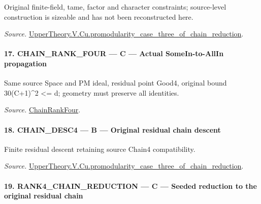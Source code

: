 \documentclass[11pt,a4paper]{article}
\numberwithin{equation}{section}
\theoremstyle{remark}\newtheorem{remark}[theorem]{Remark}
\begin{document}
Original finite-field, tame, factor and character constraints; source-level construction is sizeable and has not been reconstructed here.

\emph{Source.} \href{https://github.com/CocoSgt/riemann-hypothesis-lean/blob/7cbf7a0c32fca1badf05931879a37c3f8a2b03b4/src/Development/AutomorphicArithmetic/AutomorphicVarieties/ModularityArgument/ThresholdArguments/DenseThresholdCases/PromodularityCaseThreeOfLemmas.lean#L131-L153}{UpperTheory.V.Cu.promodularity\_\allowbreak case\_\allowbreak three\_\allowbreak of\_\allowbreak chain\_\allowbreak reduction}.



\paragraph{17. CHAIN\_\allowbreak RANK\_\allowbreak FOUR — C — Actual SomeIn-to-AllIn propagation}

Same source Space and PM ideal, residual point Good4, original bound 30(C+1)\textasciicircum{}2 <= d; geometry must preserve all identities.

\emph{Source.} \href{https://github.com/CocoSgt/riemann-hypothesis-lean/blob/7cbf7a0c32fca1badf05931879a37c3f8a2b03b4/src/Development/AutomorphicArithmetic/AutomorphicVarieties/ModularityArgument/ThresholdArguments/DenseThresholdCases/PromodularityCaseThree.lean#L26-L32}{ChainRankFour}.



\paragraph{18. CHAIN\_\allowbreak DESC4 — B — Original residual chain descent}

Finite residual descent retaining source Chain4 compatibility.

\emph{Source.} \href{https://github.com/CocoSgt/riemann-hypothesis-lean/blob/7cbf7a0c32fca1badf05931879a37c3f8a2b03b4/src/Development/AutomorphicArithmetic/AutomorphicVarieties/ModularityArgument/ThresholdArguments/DenseThresholdCases/PromodularityCaseThreeOfLemmas.lean#L131-L153}{UpperTheory.V.Cu.promodularity\_\allowbreak case\_\allowbreak three\_\allowbreak of\_\allowbreak chain\_\allowbreak reduction}.



\paragraph{19. RANK4\_\allowbreak CHAIN\_\allowbreak REDUCTION — C — Seeded reduction to the original residual chain}
\end{document}

